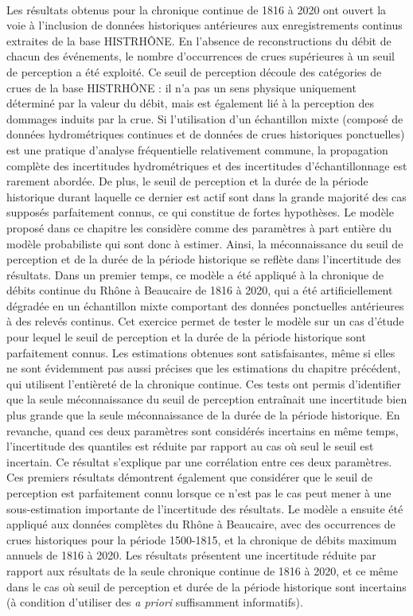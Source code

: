 	\paragraph{} Les résultats obtenus pour la chronique continue de 1816 à 2020 ont ouvert la voie à l'inclusion de données historiques antérieures aux enregistrements continus extraites de la base HISTRHÔNE. En l'absence de reconstructions du débit de chacun des événements, le nombre d'occurrences de crues supérieures à un seuil de perception a été exploité. Ce seuil de perception découle des catégories de crues de la base HISTRHÔNE : il n'a pas un sens physique uniquement déterminé par la valeur du débit, mais est également lié à la perception des dommages induits par la crue. Si l'utilisation d'un échantillon mixte (composé de données hydrométriques continues et de données de crues historiques ponctuelles) est une pratique d'analyse fréquentielle relativement commune, la propagation complète des incertitudes hydrométriques et des incertitudes d'échantillonnage est rarement abordée. De plus, le seuil de perception et la durée de la période historique durant laquelle ce dernier est actif sont dans la grande majorité des cas supposés parfaitement connus, ce qui constitue de fortes hypothèses. Le modèle proposé dans ce chapitre les considère comme des paramètres à part entière du modèle probabiliste qui sont donc à estimer. Ainsi, la méconnaissance du seuil de perception et de la durée de la période historique se reflète dans l'incertitude des résultats. Dans un premier temps, ce modèle a été appliqué à la chronique de débits continue du Rhône à Beaucaire de 1816 à 2020, qui a été artificiellement dégradée en un échantillon mixte comportant des données ponctuelles antérieures à des relevés continus. Cet exercice permet de tester le modèle sur un cas d'étude pour lequel le seuil de perception et la durée de la période historique sont parfaitement connus. Les estimations obtenues sont satisfaisantes, même si elles ne sont évidemment pas aussi précises que les estimations du chapitre précédent, qui utilisent l'entièreté de la chronique continue. Ces tests ont permis d'identifier que la seule méconnaissance du seuil de perception entraînait une incertitude bien plus grande que la seule méconnaissance de la durée de la période historique. En revanche, quand ces deux paramètres sont considérés incertains en même temps, l'incertitude des quantiles est réduite par rapport au cas où seul le seuil est incertain. Ce résultat s'explique par une corrélation entre ces deux paramètres. Ces premiers résultats démontrent également que considérer que le seuil de perception est parfaitement connu lorsque ce n'est pas le cas peut mener à une sous-estimation importante de l'incertitude des résultats. Le modèle a ensuite été appliqué aux données complètes du Rhône à Beaucaire, avec des occurrences de crues historiques pour la période 1500-1815, et la chronique de débits maximum annuels de 1816 à 2020. Les résultats présentent une incertitude réduite par rapport aux résultats de la seule chronique continue de 1816 à 2020, et ce même dans le cas où seuil de perception et durée de la période historique sont incertains (à condition d'utiliser des \textit{a priori} suffisamment informatifs). 